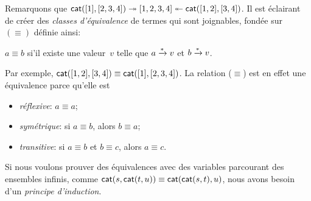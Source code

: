 Remarquons que \(\textsf{cat}([1], [2,3,4]) \twoheadrightarrow [1,2,3,4]
\twoheadleftarrow \textsf{cat}([1,2],
[3,4])\). Il est éclairant de créer des
\emph{classes d'équivalence} de termes qui sont joignables, fondée
sur~\((\equiv)\)   définie
ainsi:
\begin{center}
  \(a \equiv b\) si'il existe une valeur~\(v\) telle que \(a
  \xrightarrow{\smash[t]{*}} v\) et \(b \xrightarrow{\smash{*}} v\).
\end{center}
Par exemple, \(\textsf{cat}([1,2], [3,4]) \equiv \textsf{cat}([1],
[2,3,4])\). La relation (\(\equiv\)) est en effet une équivalence
parce qu'elle est
\begin{itemize}

  \item \emph{réflexive}: \(a \equiv a\);

  \item \emph{symétrique}: si \(a \equiv b\), alors \(b \equiv a\);

  \item \emph{transitive}: si \(a \equiv b\) et \(b \equiv c\), alors
    \(a \equiv c\).

\end{itemize}

Si nous voulons prouver des équivalences avec des variables
parcourant des ensembles infinis, comme \(\textsf{cat}(s,\textsf{cat}(t,u))
\equiv \textsf{cat}(\textsf{cat}(s,t),u)\), nous
avons besoin d'un \emph{principe d'induction}.

\label{par:well-founded}

